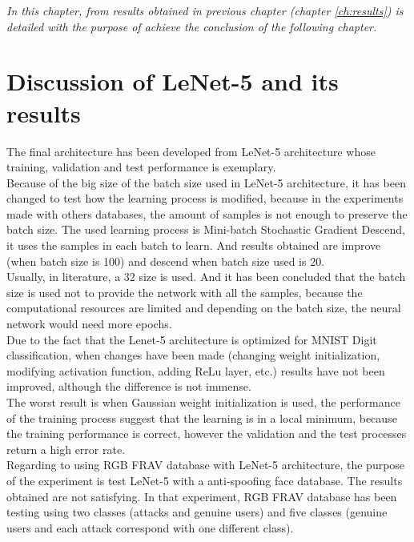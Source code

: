 \begin{small}
\emph{In this chapter, from results obtained in previous chapter (chapter \ref{ch:results}) is detailed with the purpose of achieve the conclusion of the following chapter.\\}
\end{small}

\section{Discussion of LeNet-5 and its results}
The final architecture has been developed from LeNet-5 architecture whose training, validation and test performance is exemplary.\\

Because of the big size of the batch size used in LeNet-5 architecture, it has been changed to test how the learning process is modified, because in the experiments made with others databases, the amount of samples is not enough to preserve the batch size. The used learning process is Mini-batch Stochastic Gradient Descend, it uses the samples in each batch to learn. And results obtained are improve (when batch size is 100) and descend when batch size used is 20. \\

Usually, in literature, a 32 size is used. And it has been concluded that the batch size is used not to provide the network with all the samples, because the computational resources are limited and depending on the batch size, the neural network would need more epochs.\\

Due to the fact that the Lenet-5 architecture is optimized for MNIST Digit classification, when changes have been made (changing weight initialization, modifying activation function, adding ReLu layer, etc.) results have not been improved, although the difference is not immense.\\

The worst result is when Gaussian weight initialization is used, the performance of the training process suggest that the learning is in a local minimum, because the training performance is correct, however the validation  and the test processes return a high error rate.\\

Regarding to using RGB FRAV database with LeNet-5 architecture, the purpose of the experiment is test LeNet-5 with a anti-spoofing face database. The  results obtained are not satisfying. In that experiment, RGB FRAV database has been testing using two classes (attacks and genuine users) and five classes (genuine users and each attack correspond with one different class).\\

